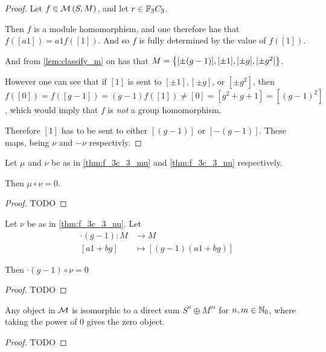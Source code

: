 \begin{proof}
    Let \( f \in {\mathcal{M}}\left( S, M \right) \), and let \( r \in {\mathbb{F}}_3C_3 \).
    
    Then \( f \) is a module homomorphism, and one therefore has that \( f([a1]) = a1 f([1]) \). And so \( f \) is fully determined by the value of \( f([1]) \). 
    
    And from \autoref{lem:classify_m} on has that \( M = \left\{ [\pm (g - 1)], [\pm 1], [\pm g], [\pm g^2] \right\} \).

    However one can see that if \( [1] \) is sent to \( [\pm 1], [\pm g] \), or \( [\pm g^2] \), then \( f([0]) = f([g - 1]) = (g - 1)f([1]) \neq [0] = [g^2 + g + 1] = [(g - 1)^2] \), which would imply that \( f \) is \emph{not} a group homomorphism.

    Therefore \( [1] \) has to be sent to either \( [(g - 1)] \) or \( [-(g - 1)] \). These maps, being \( \nu \) and \( -\nu \) respectivly.
\end{proof}

\begin{lemma} \label{thm:f_3c_3_mu_circ_nu_zero}
    Let \( \mu \) and \( \nu \) be as in \autoref{thm:f_3c_3_mu} and \autoref{thm:f_3c_3_nu} respectively.

    Then \( \mu \circ \nu = 0 \).
\end{lemma}
\begin{proof}
    TODO
\end{proof}

\begin{lemma} \label{lem:g-1_circ_nu_equals_zero}
    Let \( \nu \) be as in \autoref{thm:f_3c_3_nu}. Let
    \begin{align*}
        \cdot(g - 1): M &\to M \\
        [a1 + bg] &\mapsto [(g - 1)(a1 + bg)]
    \end{align*}

    Then \( \cdot(g - 1) \circ \nu = 0 \) 
\end{lemma}
\begin{proof}
    TODO
\end{proof}

\begin{lemma} \label{thm:f_3c_3_decomposition}
    Any object in \( {\mathcal{M}} \) is isomorphic to a direct sum \( S^n \oplus M^m \) for \( n, m \in {\mathbb{N}}_0 \), where taking the power of \( 0 \) gives the zero object.
\end{lemma}
\begin{proof}
    TODO
\end{proof}

